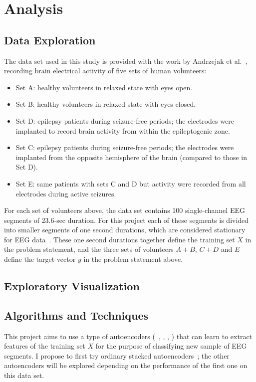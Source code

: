 \documentclass[12pt]{article}
\begin{document}
\section{Analysis}

\subsection{Data Exploration}

\label{sec:data_set}
The data set used in this study is provided with the work by Andrzejak et al.~\cite{andrzejak2001indications}, recording brain electrical activity of five sets of human volunteers:
\begin{itemize}
\item Set A: healthy volunteers in relaxed state with eyes open.
\item Set B: healthy volunteers in relaxed state with eyes closed.
\item Set D: epilepsy patients during seizure-free periods; the electrodes were implanted to record brain activity from within the epileptogenic zone.
\item Set C: epilepsy patients during seizure-free periods; the electrodes were implanted from the opposite hemisphere of the brain (compared to those in Set D).
\item Set E: same patients with sets C and D but activity were recorded from all electrodes during active seizures.
\end{itemize}

For each set of volunteers above, the data set contains 100 single-channel EEG segments of 23.6-sec duration. For this project each of these segments is divided into smaller segments of one second durations, which are considered stationary for EEG data~\cite{nigam2004neural}. These one second durations together define the training set $X$ in the problem statement, and the three sets of volunteers $A + B$, $C + D$ and $E$ define the target vector $y$ in the problem statement above.

\subsection{Exploratory Visualization}

\subsection{Algorithms and Techniques}
\label{sec:solution}

This project aims to use a type of autoencoders (~\cite{bengio2007greedy}, \cite{vincent2010stacked}, \cite{boureau2008sparse}, \cite{kingma2013auto}) that can learn to extract features of the training set $X$ for the purpose of classifying new sample of EEG segments. I propose to first try ordinary stacked autoencoders~\cite{bengio2007greedy}; the other autoencoders will be explored depending on the performance of the first one on this data set.
\end{document}
